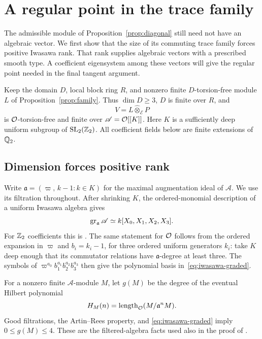 \section{A regular point in the trace family}\label{sec:regular-point}

The admissible module of Proposition~\ref{prop:diagonal} still need not
have an algebraic vector.  We first show that the size of its commuting
trace family forces positive Iwasawa rank.  That rank supplies algebraic
vectors with a prescribed smooth type.  A coefficient eigensystem among
these vectors will give the regular point needed in the final tangent
argument.

Keep the domain $D$, local block ring $R$, and nonzero finite
$D$-torsion-free module $L$ of Proposition~\ref{prop:family}.  Thus
$\dim D\geq3$, $D$ is finite over $R$, and
\[
 V=L\widehat\otimes_{\mathcal E}P
\]
is $\mathcal O$-torsion-free and finite over $\mathscr A=\mathcal O[[K]]$.
Here $K$ is a sufficiently deep uniform subgroup of $\operatorname{SL}_2(\mathbb Z_2)$.
All coefficient fields below are finite extensions of $\mathbb Q_2$.

\subsection{Dimension forces positive rank}

Write $\mathfrak a=(\varpi,\,k-1:k\in K)$ for the maximal
augmentation ideal of $\mathscr A$.  We use its filtration throughout.
After shrinking $K$, the ordered-monomial description of a uniform
Iwasawa algebra gives
\begin{equation}\label{eq:iwasawa-graded}
 \operatorname{gr}_{\mathfrak a}\mathscr A
       \simeq k[X_0,X_1,X_2,X_3].
\end{equation}
For $\mathbb Z_2$ coefficients this is
\cite[Theorem~3.22 and Lemmas~3.24--3.25]{Venjakob2002}.
The same statement for $\mathcal O$ follows from the ordered expansion in
$\varpi$ and $b_i=k_i-1$, for three ordered uniform generators $k_i$:
take $K$ deep enough that its commutator relations have
$\mathfrak a$-degree at least three.  The symbols of
$\varpi^{a_0}b_1^{a_1}b_2^{a_2}b_3^{a_3}$ then give the polynomial
basis in~\eqref{eq:iwasawa-graded}.

For a nonzero finite $\mathscr A$-module $M$, let $g(M)$ be the degree
of the eventual Hilbert polynomial
\[
 H_M(n)=\operatorname{length}_{\mathcal O}(M/\mathfrak a^nM).
\]
Good filtrations, the Artin--Rees property, and
\eqref{eq:iwasawa-graded} imply $0\leq g(M)\leq4$.
These are the filtered-algebra facts used also in the proof of
\cite[Proposition~4.4]{FM2}.

